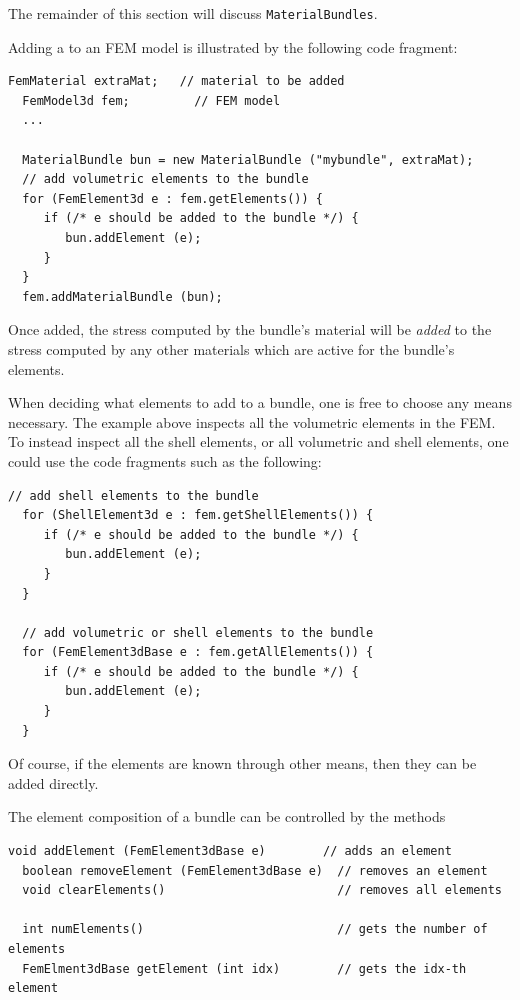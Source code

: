 The remainder of this section will discuss {\tt MaterialBundles}.

Adding a  to
an FEM model is illustrated by the following code fragment:
%
\begin{lstlisting}[]
  FemMaterial extraMat;   // material to be added
  FemModel3d fem;         // FEM model
  ...
  
  MaterialBundle bun = new MaterialBundle ("mybundle", extraMat);
  // add volumetric elements to the bundle
  for (FemElement3d e : fem.getElements()) {
     if (/* e should be added to the bundle */) {
        bun.addElement (e);
     }
  }
  fem.addMaterialBundle (bun);  
\end{lstlisting}
%
Once added, the stress computed by the bundle's material will be {\it
added} to the stress computed by any other materials which are active
for the bundle's elements.

When deciding what elements to add to a bundle, one is free to choose
any means necessary. The example above inspects all the volumetric
elements in the FEM. To instead inspect all the shell elements, or all
volumetric and shell elements, one could use the code
fragments such as the following:
%
\begin{lstlisting}[]
  // add shell elements to the bundle
  for (ShellElement3d e : fem.getShellElements()) {
     if (/* e should be added to the bundle */) {
        bun.addElement (e);
     }
  }

  // add volumetric or shell elements to the bundle
  for (FemElement3dBase e : fem.getAllElements()) {
     if (/* e should be added to the bundle */) {
        bun.addElement (e);
     }
  }
\end{lstlisting}
%
Of course, if the elements are known through other means, then they
can be added directly.

The element composition of a bundle can be controlled by the methods
%
\begin{lstlisting}[]
  void addElement (FemElement3dBase e)        // adds an element
  boolean removeElement (FemElement3dBase e)  // removes an element
  void clearElements()                        // removes all elements

  int numElements()                           // gets the number of elements
  FemElment3dBase getElement (int idx)        // gets the idx-th element 
\end{lstlisting}
%

